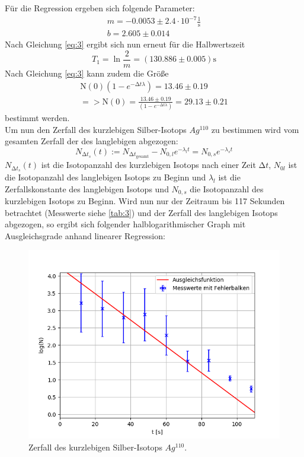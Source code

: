 Für die Regression ergeben sich folgende Parameter:
\begin{gather*}
	m = -0.0053\pm 2.4\cdot10^{-7} \frac{1}{\text{s}}\\
	b = 2.605\pm0.014
\end{gather*}
Nach Gleichung \ref{eq:3} ergibt sich nun erneut für die Halbwertszeit
\begin{equation}
	T_1 = \ln{\frac{2}{m}} = (130.886 \pm 0.005) \text{s}
\end{equation}
Nach Gleichung \ref{eq:3} kann zudem die Größe
\begin{gather*}
	\text{N}(0)(1-e^{-\increment t\lambda}) = 13.46 \pm 0.19 \\
	=> \text{N}(0) = \frac{13.46 \pm 0.19}{(1-e^{-\increment t\lambda})} = 29.13 \pm 0.21
\end{gather*} bestimmt werden.
\\
Um nun den Zerfall des kurzlebigen Silber-Isotops $Ag^{110}$ zu bestimmen wird vom gesamten Zerfall der des langlebigen abgezogen:
\begin{equation*}
	N_{\increment t_s}(t) := N_{\increment t_\text{gesamt}} - N_{0,l} e^{-\lambda_l t} = N_{0,s} e^{-\lambda_s t}
\end{equation*} 
$N_{\increment t_s}(t)$ ist die Isotopanzahl des kurzlebigen Isotops nach einer Zeit $\increment t$, $N_{0l}$ ist die Isotopanzahl des langlebigen Isotops zu Beginn und  $\lambda_l$ ist die Zerfallskonstante des langlebigen Isotops und $N_{0,s}$ die Isotopanzahl des kurzlebigen Isotops zu Beginn.
Wird nun nur der Zeitraum bis 117 Sekunden betrachtet (Messwerte siehe \ref{tab:3}) und der Zerfall des langlebigen Isotops abgezogen, so ergibt sich folgender halblogarithmischer Graph mit Ausgleichsgrade anhand linearer Regression:
\begin{figure}[H]
    \centering
    \includegraphics[scale=0.7]{Auswertung/kurz.png}
    \caption{Zerfall des kurzlebigen Silber-Isotops $Ag^{110}$.}
    \label{fig:kurz}
\end{figure}
